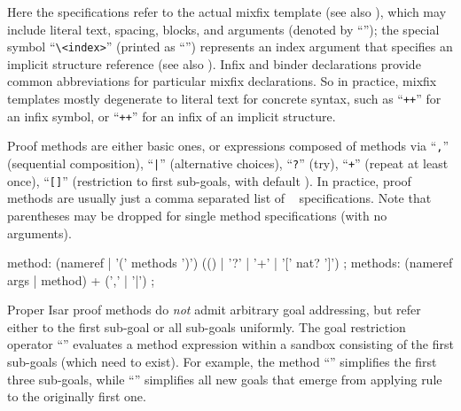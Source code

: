 \begin{isabellebody}
\begin{isamarkuptext}
  Here the  specifications refer to the actual mixfix
  template (see also \cite{isabelle-ref}), which may include literal
  text, spacing, blocks, and arguments (denoted by ``\isa{{\isacharunderscore}}''); the
  special symbol ``\verb|\<index>|'' (printed as ``\isa{{\isasymindex}}'')
  represents an index argument that specifies an implicit structure
  reference (see also ).  Infix and binder
  declarations provide common abbreviations for particular mixfix
  declarations.  So in practice, mixfix templates mostly degenerate to
  literal text for concrete syntax, such as ``\verb|++|'' for
  an infix symbol, or ``\verb|++|\isa{{\isasymindex}}'' for an infix of
  an implicit structure.%
\end{isamarkuptext}%
\isamarkuptrue%
%
\isamarkuptrue%
%
\begin{isamarkuptext}%
Proof methods are either basic ones, or expressions composed of
  methods via ``\verb|,|'' (sequential composition),
  ``\verb||\verb,|,\verb||'' (alternative choices), ``\verb|?|'' 
  (try), ``\verb|+|'' (repeat at least once), ``\verb|[|\verb|]|'' (restriction to first 
  sub-goals, with default ).  In practice, proof
  methods are usually just a comma separated list of
  ~ specifications.  Note that
  parentheses may be dropped for single method specifications (with no
  arguments).

  \begin{rail}
    method: (nameref | '(' methods ')') (() | '?' | '+' | '[' nat? ']')
    ;
    methods: (nameref args | method) + (',' | '|')
    ;
  \end{rail}

  Proper Isar proof methods do \emph{not} admit arbitrary goal
  addressing, but refer either to the first sub-goal or all sub-goals
  uniformly.  The goal restriction operator ``''
  evaluates a method expression within a sandbox consisting of the
  first  sub-goals (which need to exist).  For example, the
  method ``'' simplifies the first three
  sub-goals, while ``'' simplifies all
  new goals that emerge from applying rule  to the
  originally first one.


\end{isamarkuptext}
\end{isabellebody}
